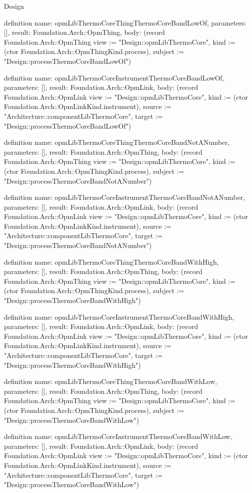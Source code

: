 \begin{lexlean}{Design}
\begin{semanticmodule}
definition{
  name: opmLibThermoCoreThingThermoCoreBandLowOf,
  parameters: [],
  result: Foundation.Arch::OpmThing,
  body: (record Foundation.Arch::OpmThing {view := "Design::opmLibThermoCore", kind := (ctor Foundation.Arch::OpmThingKind.process), subject := "Design::processThermoCoreBandLowOf"})
}

definition{
  name: opmLibThermoCoreInstrumentThermoCoreBandLowOf,
  parameters: [],
  result: Foundation.Arch::OpmLink,
  body: (record Foundation.Arch::OpmLink {view := "Design::opmLibThermoCore", kind := (ctor Foundation.Arch::OpmLinkKind.instrument), source := "Architecture::componentLibThermoCore", target := "Design::processThermoCoreBandLowOf"})
}

definition{
  name: opmLibThermoCoreThingThermoCoreBandNotANumber,
  parameters: [],
  result: Foundation.Arch::OpmThing,
  body: (record Foundation.Arch::OpmThing {view := "Design::opmLibThermoCore", kind := (ctor Foundation.Arch::OpmThingKind.process), subject := "Design::processThermoCoreBandNotANumber"})
}

definition{
  name: opmLibThermoCoreInstrumentThermoCoreBandNotANumber,
  parameters: [],
  result: Foundation.Arch::OpmLink,
  body: (record Foundation.Arch::OpmLink {view := "Design::opmLibThermoCore", kind := (ctor Foundation.Arch::OpmLinkKind.instrument), source := "Architecture::componentLibThermoCore", target := "Design::processThermoCoreBandNotANumber"})
}

definition{
  name: opmLibThermoCoreThingThermoCoreBandWithHigh,
  parameters: [],
  result: Foundation.Arch::OpmThing,
  body: (record Foundation.Arch::OpmThing {view := "Design::opmLibThermoCore", kind := (ctor Foundation.Arch::OpmThingKind.process), subject := "Design::processThermoCoreBandWithHigh"})
}

definition{
  name: opmLibThermoCoreInstrumentThermoCoreBandWithHigh,
  parameters: [],
  result: Foundation.Arch::OpmLink,
  body: (record Foundation.Arch::OpmLink {view := "Design::opmLibThermoCore", kind := (ctor Foundation.Arch::OpmLinkKind.instrument), source := "Architecture::componentLibThermoCore", target := "Design::processThermoCoreBandWithHigh"})
}

definition{
  name: opmLibThermoCoreThingThermoCoreBandWithLow,
  parameters: [],
  result: Foundation.Arch::OpmThing,
  body: (record Foundation.Arch::OpmThing {view := "Design::opmLibThermoCore", kind := (ctor Foundation.Arch::OpmThingKind.process), subject := "Design::processThermoCoreBandWithLow"})
}

definition{
  name: opmLibThermoCoreInstrumentThermoCoreBandWithLow,
  parameters: [],
  result: Foundation.Arch::OpmLink,
  body: (record Foundation.Arch::OpmLink {view := "Design::opmLibThermoCore", kind := (ctor Foundation.Arch::OpmLinkKind.instrument), source := "Architecture::componentLibThermoCore", target := "Design::processThermoCoreBandWithLow"})
}


\end{semanticmodule}
\end{lexlean}
